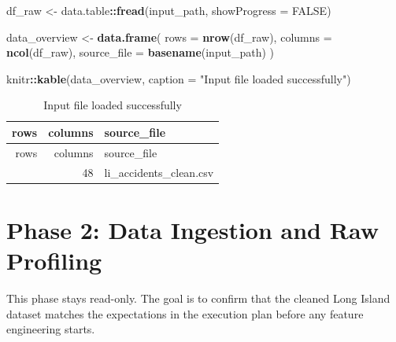 \documentclass[
]{article}
\newenvironment{Shaded}{\begin{snugshade}}{\end{snugshade}}
\newcommand{\AttributeTok}[1]{\textcolor[rgb]{0.13,0.29,0.53}{#1}}
\newcommand{\ConstantTok}[1]{\textcolor[rgb]{0.56,0.35,0.01}{#1}}
\newcommand{\FunctionTok}[1]{\textcolor[rgb]{0.13,0.29,0.53}{\textbf{#1}}}
\newcommand{\NormalTok}[1]{#1}
\newcommand{\OtherTok}[1]{\textcolor[rgb]{0.56,0.35,0.01}{#1}}
\newcommand{\SpecialCharTok}[1]{\textcolor[rgb]{0.81,0.36,0.00}{\textbf{#1}}}
\newcommand{\StringTok}[1]{\textcolor[rgb]{0.31,0.60,0.02}{#1}}
\begin{document}
\begin{Shaded}
\begin{Highlighting}[]
\NormalTok{df\_raw }\OtherTok{\textless{}{-}}\NormalTok{ data.table}\SpecialCharTok{::}\FunctionTok{fread}\NormalTok{(input\_path, }\AttributeTok{showProgress =} \ConstantTok{FALSE}\NormalTok{)}

\NormalTok{data\_overview }\OtherTok{\textless{}{-}} \FunctionTok{data.frame}\NormalTok{(}
  \AttributeTok{rows =} \FunctionTok{nrow}\NormalTok{(df\_raw),}
  \AttributeTok{columns =} \FunctionTok{ncol}\NormalTok{(df\_raw),}
  \AttributeTok{source\_file =} \FunctionTok{basename}\NormalTok{(input\_path)}
\NormalTok{)}

\NormalTok{knitr}\SpecialCharTok{::}\FunctionTok{kable}\NormalTok{(data\_overview, }\AttributeTok{caption =} \StringTok{"Input file loaded successfully"}\NormalTok{)}
\end{Highlighting}
\end{Shaded}

\begin{longtable}[]{@{}rrl@{}}
\caption{Input file loaded successfully}\tabularnewline
\toprule\noalign{}
rows & columns & source\_file \\
\midrule\noalign{}
\endfirsthead
\toprule\noalign{}
rows & columns & source\_file \\
\midrule\noalign{}
\endhead
\bottomrule\noalign{}
\endlastfoot
33228 & 48 & li\_accidents\_clean.csv \\
\end{longtable}

\section{Phase 2: Data Ingestion and Raw
Profiling}\label{phase-2-data-ingestion-and-raw-profiling}

This phase stays read-only. The goal is to confirm that the cleaned Long
Island dataset matches the expectations in the execution plan before any
feature engineering starts.
\end{document}
